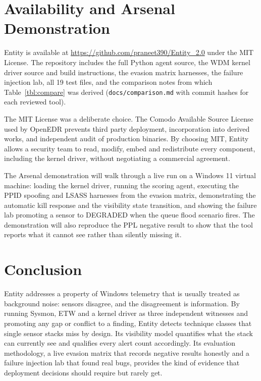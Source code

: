 \documentclass[10pt,twocolumn,letterpaper]{article}
\newcommand{\code}[1]{\texttt{\small #1}}
\begin{document}
\section{Availability and Arsenal Demonstration}
\label{sec:avail}

Entity is available at \url{https://github.com/praneet390/Entity_2.0} under the MIT
License. The repository includes the full Python agent source, the WDM kernel driver
source and build instructions, the evasion matrix harnesses, the failure injection lab,
all 19 test files, and the comparison notes from which Table~\ref{tbl:compare} was
derived (\code{docs/comparison.md} with commit hashes for each reviewed tool).

The MIT License was a deliberate choice. The Comodo Available Source License used by
OpenEDR prevents third party deployment, incorporation into derived works, and
independent audit of production binaries. By choosing MIT, Entity allows a security
team to read, modify, embed and redistribute every component, including the kernel
driver, without negotiating a commercial agreement.

The Arsenal demonstration will walk through a live run on a Windows 11 virtual machine:
loading the kernel driver, running the scoring agent, executing the PPID spoofing and
LSASS harnesses from the evasion matrix, demonstrating the automatic kill response and
the visibility state transition, and showing the failure lab promoting a sensor to
DEGRADED when the queue flood scenario fires. The demonstration will also reproduce
the PPL negative result to show that the tool reports what it cannot see rather than
silently missing it.

\section{Conclusion}
\label{sec:conclusion}

Entity addresses a property of Windows telemetry that is usually treated as background
noise: sensors disagree, and the disagreement is information. By running Sysmon, ETW and
a kernel driver as three independent witnesses and promoting any gap or conflict to a
finding, Entity detects technique classes that single sensor stacks miss by design. Its
visibility model quantifies what the stack can currently see and qualifies every alert
count accordingly. Its evaluation methodology, a live evasion matrix that records negative
results honestly and a failure injection lab that found real bugs, provides the kind of
evidence that deployment decisions should require but rarely get.
\end{document}
